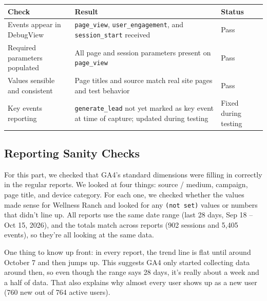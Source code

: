 \documentclass[
  letterpaper,
  DIV=11,
  numbers=noendperiod]{scrartcl}
\newcounter{none} %
\begin{document}
{\def\LTcaptype{none} %
\begin{longtable}[]{@{}
  >{\raggedright\arraybackslash}p{}
  >{\raggedright\arraybackslash}p{}
  >{\raggedright\arraybackslash}p{}@{}}
\toprule\noalign{}
\begin{minipage}[b]{\linewidth}\raggedright
Check
\end{minipage} & \begin{minipage}[b]{\linewidth}\raggedright
Result
\end{minipage} & \begin{minipage}[b]{\linewidth}\raggedright
Status
\end{minipage} \\
\midrule\noalign{}
\endhead
\bottomrule\noalign{}
\endlastfoot
Events appear in DebugView & \texttt{page\_view},
\texttt{user\_engagement}, and \texttt{session\_start} received &
Pass \\
Required parameters populated & All page and session parameters present
on \texttt{page\_view} & Pass \\
Values sensible and consistent & Page titles and source match real site
pages and test behavior & Pass \\
Key events reporting & \texttt{generate\_lead} not yet marked as key
event at time of capture; updated during testing & Fixed during
testing \\
\end{longtable}
}

\subsection{Reporting Sanity Checks}\label{reporting-sanity-checks}

For this part, we checked that GA4's standard dimensions were filling in
correctly in the regular reports. We looked at four things: source /
medium, campaign, page title, and device category. For each one, we
checked whether the values made sense for Wellness Ranch and looked for
any \texttt{(not\ set)} values or numbers that didn't line up. All
reports use the same date range (last 28 days, Sep 18 -- Oct 15, 2026),
and the totals match across reports (902 sessions and 5,405 events), so
they're all looking at the same data.

One thing to know up front: in every report, the trend line is flat
until around October 7 and then jumps up. This suggests GA4 only started
collecting data around then, so even though the range says 28 days, it's
really about a week and a half of data. That also explains why almost
every user shows up as a new user (760 new out of 764 active users).
\end{document}
